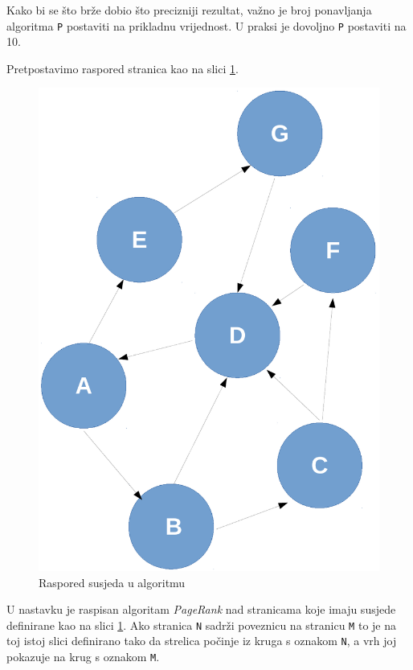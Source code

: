 \documentclass[times, utf8, zavrsni, numeric]{fer}
\begin{document}
Kako bi se što brže dobio što precizniji rezultat, važno je broj ponavljanja algoritma  \texttt{P} postaviti na prikladnu vrijednost. U praksi je dovoljno \texttt{P} postaviti na 10. 

Pretpostavimo raspored stranica kao na slici \ref{fig:pageRankSusjedi}.

\begin{figure}[htb]
\centering
\includegraphics[scale = 0.5]{img/algoritamPageRankRucnoCropped.pdf}
\caption{Raspored susjeda u algoritmu}
\label{fig:pageRankSusjedi}
\end{figure}

U nastavku je raspisan algoritam \emph{PageRank} nad stranicama koje imaju susjede definirane kao na slici \ref{fig:pageRankSusjedi}. Ako stranica \texttt{N} sadrži poveznicu na stranicu \texttt{M} to je na toj istoj slici definirano tako da strelica počinje iz kruga s oznakom \texttt{N}, a vrh joj pokazuje na krug s oznakom \texttt{M}.
\end{document}
